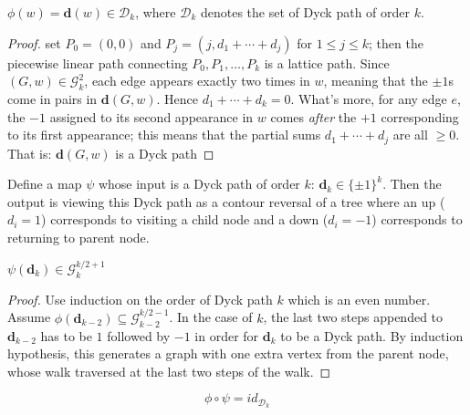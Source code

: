 \begin{lemma}
  \notready
  \label{lem:graph_Dyck_correspondence}
  $\phi(w) = \mathbf{d}(w) \in \mathcal{D}_k$, where $\mathcal{D}_k$ denotes the set of Dyck path of order $k$.
\end{lemma}

\begin{proof}
  \notready
  set $P_0 = (0,0)$ and $P_j = (j,d_1+\cdots+d_j)$ for $1\le j\le k$; then the piecewise linear path
  connecting $P_0,P_1,\ldots,P_k$ is a lattice path.  Since $(G,w)\in\mathcal{G}_k^2$, each edge appears exactly two times in $w$,
  meaning that the $\pm1$s come in pairs in $\mathbf{d}(G,w)$.  Hence $d_1+\cdots+d_k=0$.  What's more, for any edge $e$,
  the $-1$ assigned to its second appearance in $w$ comes {\em after} the $+1$ corresponding to its first appearance;
  this means that the partial sums $d_1+\cdots+d_j$ are all $\ge 0$.  That is: $\mathbf{d}(G,w)$ is a Dyck path
\end{proof}


\begin{definition}
  \notready
  \label{def:Dyck_to_graph_map}
  Define a map $\psi$ whose input is a Dyck path of order $k$: $\mathbf{d}_k \in \{\pm1\}^k$. Then the output is viewing
  this Dyck path as a contour reversal of a tree where an up ($d_i = 1$) corresponds to visiting a child node
  and a down ($d_i = -1$) corresponds to returning to parent node.
\end{definition}


\begin{lemma}
  \notready
  \label{lem:Dyck_graph_correspondence}
  $\psi(\mathbf{d}_k) \in \mathcal{G}^{k/2 + 1}_k$
\end{lemma}

\begin{proof}
  \notready
  Use induction on the order of Dyck path $k$ which is an even number. Assume $\phi(\mathbf{d}_{k-2})
  \subseteq \mathcal{G}_{k-2}^{k/2 -1}$. In the case of $k$, the last two steps appended to $\mathbf{d}_{k-2}$
  has to be $1$ followed by $-1$ in order for $\mathbf{d}_k$ to be a Dyck path. By induction hypothesis,
  this generates a graph with one extra vertex from the parent node, whose walk traversed at the last two steps of the walk.
\end{proof}


\begin{lemma}
  \notready
  \label{lem:composition1}
  $$\phi \circ \psi = id_{\mathcal{D}_k}$$
\end{lemma}

